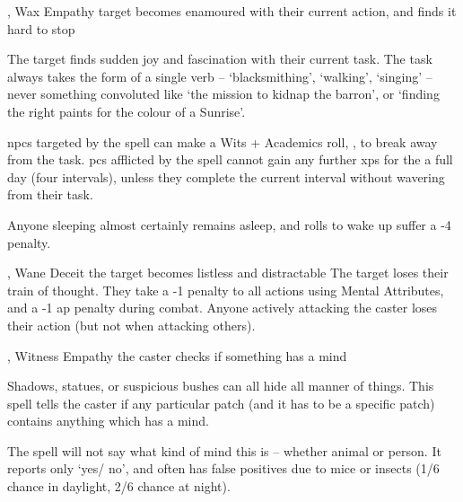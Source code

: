   {\mFate, \mWater}%
  {Wax}%
  {}%
  {Empathy}%
  {target becomes enamoured with their current action, and finds it hard to stop}%
  {
    The target finds sudden joy and fascination with their current task.
    The task always takes the form of a single verb -- `blacksmithing', `walking', `singing' -- never something convoluted like `the mission to kidnap the barron', or `finding the right paints for the colour of a Sunrise'.

    \Glspl{npc} targeted by the spell can make a Wits + Academics roll, , to break away from the task.
    \Glspl{pc} afflicted by the spell cannot gain any further \glspl{xp} for the a full day (four \glspl{interval}), unless they complete the current \gls{interval} without wavering from their task.

  Anyone sleeping almost certainly remains asleep, and rolls to wake up suffer a -4 penalty.
  }

  {\mFate, \mWater}%
  {Wane}%
  {}%
  {Deceit}%
  {the target becomes listless and distractable}%
  {
    The target loses their train of thought.
    They take a -1 penalty to all actions using Mental Attributes, and a -1 \gls{ap} penalty during combat.
    Anyone actively attacking the caster loses their action (but not when attacking others).
  }

  {\mFate, \mWater}%
  {Witness}%
  {}%
  {Empathy}%
  {the caster checks if something has a mind}%
  {
    Shadows, statues, or suspicious bushes can all hide all manner of things.
    This spell tells the caster if any particular patch (and it has to be a specific patch) contains anything which has a mind.

    The spell will not say what kind of mind this is -- whether animal or person.
    It reports only `yes/ no', and often has false positives due to mice or insects (1/6 chance in daylight, 2/6 chance at night).
  }

